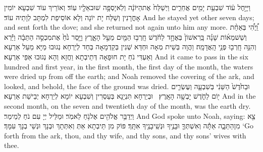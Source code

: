 {וַיִּיָּ֣חֶל ע֔וֹד שִׁבְעַ֥ת יָמִ֖ים אֲחֵרִ֑ים וַיְשַׁלַּח֙ אֶת\maqqaf הַיּוֹנָ֔ה וְלֹֽא\maqqaf יָסְפָ֥ה שׁוּב\maqqaf אֵלָ֖יו עֽוֹד׃}
{וְאוֹרֵיךְ עוֹד שִׁבְעָא יוֹמִין אָחֳרָנִין וְשַׁלַּח יָת יוֹנָה וְלָא אוֹסֵיפַת לִמְתָּב לְוָתֵיהּ עוֹד׃}
{And he stayed yet other seven days; and sent forth the dove; and she returned not again unto him any more.}{}
{וַֽ֠יְהִ֠י בְּאַחַ֨ת וְשֵׁשׁ\maqqaf מֵא֜וֹת שָׁנָ֗ה בָּֽרִאשׁוֹן֙ בְּאֶחָ֣ד לַחֹ֔דֶשׁ חָֽרְב֥וּ הַמַּ֖יִם מֵעַ֣ל הָאָ֑רֶץ וַיָּ֤סַר נֹ֙חַ֙ אֶת\maqqaf מִכְסֵ֣ה הַתֵּבָ֔ה וַיַּ֕רְא וְהִנֵּ֥ה חָֽרְב֖וּ פְּנֵ֥י הָֽאֲדָמָֽה׃}
{וַהֲוָה בְּשֵׁית מְאָה וּחְדַּא שְׁנִין בְּקַדְמָאָה בְּחַד לְיַרְחָא נְגוּבוּ מַיָּא מֵעַל אַרְעָא וְאַעְדִּי נֹחַ יָת חוּפָאָה דְּתֵיבְתָא וַחֲזָא וְהָא נְגוּבוּ אַפֵּי אַרְעָא׃}
{And it came to pass in the six hundred and first year, in the first month, the first day of the month, the waters were dried up from off the earth; and Noah removed the covering of the ark, and looked, and behold, the face of the ground was dried.}{}
{וּבַחֹ֙דֶשׁ֙ הַשֵּׁנִ֔י בְּשִׁבְעָ֧ה וְעֶשְׂרִ֛ים י֖וֹם לַחֹ֑דֶשׁ יָבְשָׁ֖ה הָאָֽרֶץ׃ \setuma }
{וּבְיַרְחָא תִּנְיָנָא בְּעַסְרִין וְשִׁבְעָא יוֹמָא לְיַרְחָא יְבֵישַׁת אַרְעָא׃}
{And in the second month, on the seven and twentieth day of the month, was the earth dry.}{}
{וַיְדַבֵּ֥ר אֱלֹהִ֖ים אֶל\maqqaf נֹ֥חַ לֵאמֹֽר׃}
{וּמַלֵּיל יְיָ עִם נֹחַ לְמֵימַר׃}
{And God spoke unto Noah, saying:}{}
{צֵ֖א מִן\maqqaf הַתֵּבָ֑ה אַתָּ֕ה וְאִשְׁתְּךָ֛ וּבָנֶ֥יךָ וּנְשֵֽׁי\maqqaf בָנֶ֖יךָ אִתָּֽךְ׃}
{פּוֹק מִן תֵּיבְתָא אַתְּ וְאִתְּתָךְ וּבְנָךְ וּנְשֵׁי בְנָךְ עִמָּךְ׃}
{‘Go forth from the ark, thou, and thy wife, and thy sons, and thy sons’ wives with thee.}{}
